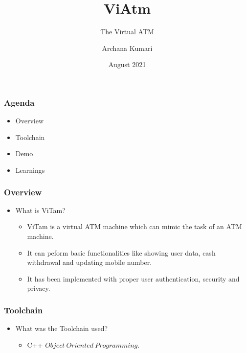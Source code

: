 \documentclass[12pt]{beamer}
\author{Archana Kumari}
\title{ViAtm}
\subtitle{The Virtual ATM}
\date{August 2021}
\begin{document}
\begin{frame}
\maketitle
\end{frame}

\begin{frame}
    \frametitle{Agenda} 
             \begin{itemize}
             \item {Overview}
             \item {Toolchain}
             \item {Demo}
             \item {Learnings}
          
             \end{itemize}         
\end{frame} 

\begin{frame}
    \frametitle{Overview}
    \begin{itemize}
        \item  {What is ViTam?}
             \begin{itemize}
             \item {ViTam is a virtual ATM machine which can mimic the task of an ATM machine.}
             \item{It can peform basic functionalities like showing user data, cash withdrawal and updating mobile number.}
             \item{It has been implemented with proper user authentication, security and privacy.}
            
             \end{itemize}     
\end{itemize}       
\end{frame} 
\begin{frame}
    \frametitle{Toolchain}
    \begin{itemize}          
        \item What was the Toolchain used?
             \begin{itemize}
             \item { C++ \(Object \ Oriented \ Programming.\) }  
             \end{itemize}
    \end{itemize}       
\end{frame}     
\end{document}
